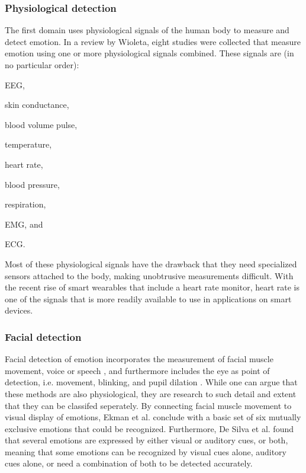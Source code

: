 \documentclass{sigchi}
\begin{document}
\subsubsection{Physiological detection} %
\label{sub:physiology}
The first domain uses physiological signals of the human body to measure and detect emotion. In a review by Wioleta\cite{Wioleta2013}, eight studies were collected that measure emotion using one or more physiological signals combined. These signals are (in no particular order):
\begin{enumerate*}[label=(\alph*)]
  \item EEG,
  \item skin conductance,
  \item blood volume pulse,
  \item temperature,
  \item heart rate,
  \item blood pressure,
  \item respiration,
  \item EMG, and
  \item ECG.
\end{enumerate*}
Most of these physiological signals have the drawback that they need specialized sensors attached to the body, making unobtrusive measurements difficult. With the recent rise of smart wearables that include a heart rate monitor, heart rate is one of the signals that is more readily available to use in applications on smart devices.

\subsubsection{Facial detection} %
\label{sub:facial_detection}
Facial detection of emotion incorporates the measurement of facial muscle movement, voice or speech \cite{Ververidis2004}, and furthermore includes the eye as point of detection, i.e. movement, blinking, and pupil dilation \cite{Soleymani2015}. While one can argue that these methods are also physiological, they are research to such detail and extent that they can be classifed seperately. By connecting facial muscle movement to visual display of emotions, Ekman et al. \cite{Ekman1969} conclude with a basic set of six mutually exclusive emotions that could be recognized. Furthermore, De Silva et al. \cite{Silva1997} found that several emotions are expressed by either visual or auditory cues, or both, meaning that some emotions can be recognized by visual cues alone, auditory cues alone, or need a combination of both to be detected accurately.
\end{document}
